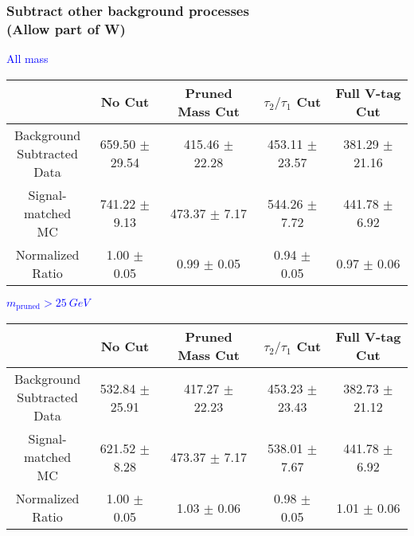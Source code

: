 \documentclass{beamer}
\begin{document}
\begin{frame}
  \frametitle{Subtract other background processes \\ (Allow part of W)}
  \begin{adjustwidth}{-1.5em}{-1.5em}
    \centering
    \vspace{6pt}
    \textcolor{blue}{All mass}
    \vspace{6pt}

    {\scriptsize
      \begin{tabular}{c | c | c | c | c}
        \hline
        & No Cut & Pruned Mass Cut & $\tau_2/\tau_1$ Cut & Full V-tag Cut \\
        \hline
        \makecell{Background \\ Subtracted \\ Data} & 659.50 $\pm$ 29.54 & 415.46 $\pm$ 22.28 & 453.11 $\pm$ 23.57 & 381.29 $\pm$ 21.16 \\
        \makecell{Signal-\\ matched MC} & 741.22 $\pm$ 9.13 & 473.37 $\pm$ 7.17 & 544.26 $\pm$ 7.72 & 441.78 $\pm$ 6.92 \\
        \hline
        \makecell{Normalized \\ Ratio} & 1.00 $\pm$ 0.05 & 0.99 $\pm$ 0.05 & 0.94 $\pm$ 0.05 & 0.97 $\pm$ 0.06 \\
        \hline
      \end{tabular}
    }

    \vspace{6pt}
    \textcolor{blue}{$m_\text{pruned} > \SI{25}{GeV}$}
    \vspace{6pt}

    {\scriptsize
      \begin{tabular}{c | c | c | c | c}
        \hline
        & No Cut & Pruned Mass Cut & $\tau_2/\tau_1$ Cut & Full V-tag Cut \\
        \hline
        \makecell{Background \\ Subtracted \\ Data} & 532.84 $\pm$ 25.91 & 417.27 $\pm$ 22.23 & 453.23 $\pm$ 23.43 & 382.73 $\pm$ 21.12 \\
        \makecell{Signal-\\ matched MC} & 621.52 $\pm$ 8.28 & 473.37 $\pm$ 7.17 & 538.01 $\pm$ 7.67 & 441.78 $\pm$ 6.92 \\
        \hline
        \makecell{Normalized \\ Ratio} & 1.00 $\pm$ 0.05 & 1.03 $\pm$ 0.06 & 0.98 $\pm$ 0.05 & 1.01 $\pm$ 0.06 \\
        \hline
      \end{tabular}
    }
  \end{adjustwidth}
\end{frame}
\end{document}
